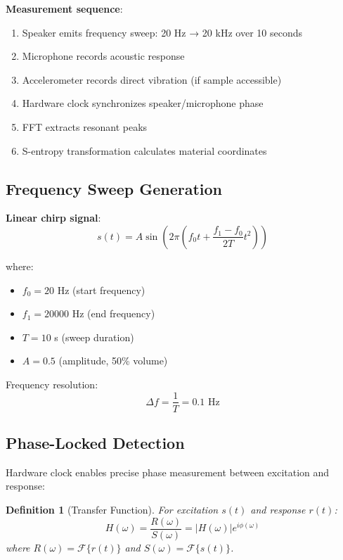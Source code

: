 \documentclass[12pt,a4paper]{article}
\newtheorem{definition}{Definition}
\begin{document}
\textbf{Measurement sequence}:
\begin{enumerate}
\item Speaker emits frequency sweep: 20 Hz → 20 kHz over 10 seconds
\item Microphone records acoustic response
\item Accelerometer records direct vibration (if sample accessible)
\item Hardware clock synchronizes speaker/microphone phase
\item FFT extracts resonant peaks
\item S-entropy transformation calculates material coordinates
\end{enumerate}

\subsection{Frequency Sweep Generation}

\textbf{Linear chirp signal}:
\begin{equation}
s(t) = A\sin\left(2\pi\left(f_0 t + \frac{f_1 - f_0}{2T}t^2\right)\right)
\end{equation}

where:
\begin{itemize}
\item $f_0 = 20$ Hz (start frequency)
\item $f_1 = 20000$ Hz (end frequency)
\item $T = 10$ s (sweep duration)
\item $A = 0.5$ (amplitude, 50\% volume)
\end{itemize}

Frequency resolution:
\begin{equation}
\Delta f = \frac{1}{T} = 0.1 \text{ Hz}
\end{equation}

\subsection{Phase-Locked Detection}

Hardware clock enables precise phase measurement between excitation and response:

\begin{definition}[Transfer Function]
For excitation $s(t)$ and response $r(t)$:
\begin{equation}
H(\omega) = \frac{R(\omega)}{S(\omega)} = |H(\omega)|e^{i\phi(\omega)}
\end{equation}
where $R(\omega) = \mathcal{F}\{r(t)\}$ and $S(\omega) = \mathcal{F}\{s(t)\}$.
\end{definition}
\end{document}
